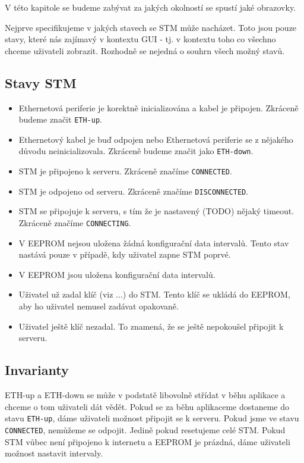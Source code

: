 
V této kapitole se budeme zabývat za jakých okolností se spustí jaké obrazovky.

Nejprve specifikujeme v jakých stavech se STM může nacházet.
Toto jsou pouze stavy, které nás zajímavý v kontextu GUI - tj. v kontextu toho co všechno chceme
uživateli zobrazit.
Rozhodně se nejedná o souhrn všech možný stavů.
\subsection{Stavy STM}
\begin{itemize}
  \item Ethernetová periferie je korektně inicializována a kabel je připojen. Zkráceně budeme
        značit \texttt{ETH-up}.
  \item Ethernetový kabel je buď odpojen nebo Ethernetová periferie se z nějakého důvodu
        neinicializovala. Zkráceně budeme značit jako \texttt{ETH-down}.
  \item STM je připojeno k serveru. Zkráceně značíme \texttt{CONNECTED}.
  \item STM je odpojeno od serveru. Zkráceně značíme \texttt{DISCONNECTED}.
  \item STM se připojuje k serveru, s tím že je nastavený (TODO) nějaký timeout. Zkráceně značíme
        \texttt{CONNECTING}.
  \item V EEPROM nejsou uložena žádná konfigurační data intervalů. Tento stav nastává pouze v případě,
        kdy uživatel zapne STM poprvé.
  \item V EEPROM jsou uložena konfigurační data intervalů.
  \item Uživatel už zadal klíč (viz ...) do STM. Tento klíč se ukládá do EEPROM, aby ho uživatel
        nemusel zadávat opakovaně.
  \item Uživatel ještě klíč nezadal. To znamená, že se ještě nepokoušel připojit k serveru.
\end{itemize}

\subsection{Invarianty}
ETH-up a ETH-down se může v podstatě libovolně střídat v běhu aplikace a chceme o tom uživateli
dát vědět.
Pokud se za běhu aplikaceme dostaneme do stavu \texttt{ETH-up}, dáme uživateli možnost připojit
se k serveru.
Pokud jsme ve stavu \texttt{CONNECTED}, nemůžeme se odpojit. Jedině pokud resetujeme celé STM.
Pokud STM vůbec není připojeno k internetu a EEPROM je prázdná, dáme uživateli možnost nastavit
intervaly.

